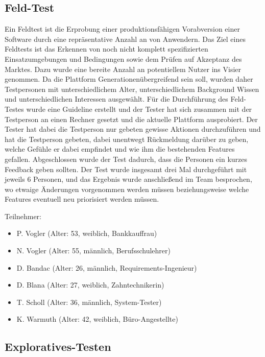 \subsection{Feld-Test}
\label{sub:UmsetzungTestFeld}

Ein Feldtest ist die Erprobung einer produktionsfähigen Vorabversion einer Software durch eine repräsentative Anzahl an von Anwendern. Das Ziel eines Feldtests ist das Erkennen von noch nicht komplett spezifizierten Einsatzumgebungen und Bedingungen sowie dem Prüfen auf Akzeptanz des Marktes.
Dazu wurde eine bereite Anzahl an potentiellem Nutzer ins Visier genommen. Da die Plattform Generationenübergreifend sein soll, wurden daher Testpersonen mit unterschiedlichem Alter, unterschiedlichem Background Wissen und unterschiedlichen Interessen ausgewählt.
Für die Durchführung des Feld-Testes wurde eine Guideline erstellt und der Tester hat sich zusammen mit der Testperson an einen Rechner gesetzt und die aktuelle Plattform ausprobiert. Der Tester hat dabei die Testperson nur gebeten gewisse Aktionen durchzuführen und hat die Testperson gebeten, dabei unentwegt Rückmeldung darüber zu geben, welche Gefühle er dabei empfindet und wie ihm die bestehenden Features gefallen. Abgeschlossen wurde der Test dadurch, dass die Personen ein kurzes Feedback geben sollten.
Der Test wurde insgesamt drei Mal durchgeführt mit jeweils 6 Personen, und das Ergebnis wurde anschließend im Team besprochen, wo etwaige Änderungen vorgenommen werden müssen beziehungsweise welche Features eventuell neu priorisiert werden müssen.

Teilnehmer:
\begin{itemize}
    \item P. Vogler (Alter: 53, weiblich, Bankkauffrau)
    \item N. Vogler (Alter: 55, männlich, Berufsschulehrer)
    \item D. Bandac (Alter: 26, männlich, Requirements-Ingenieur)
    \item D. Blana (Alter: 27, weiblich, Zahntechnikerin)
    \item T. Scholl (Alter: 36, männlich, System-Tester)
    \item K. Warmuth (Alter: 42, weiblich, Büro-Angestellte)
  \end{itemize}

  \subsection{Exploratives-Testen}
\label{sub:UmsetzungTestExplorativ}

